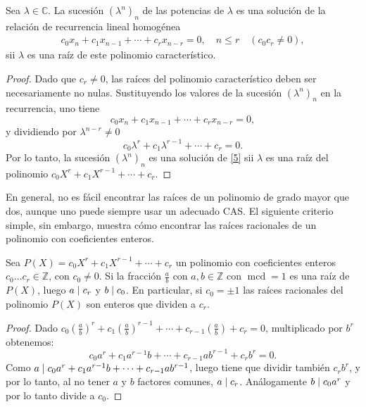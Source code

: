 \begin{proposition}
	Sea $\lambda\in\mathds{C}$. La sucesión $\left(\lambda^{n}\right)_{n}$ de las potencias de $\lambda$ es una solución de la relación de recurrencia lineal homogénea
	\begin{align}\label{5}
	c_{0}x_{n}+c_{1}x_{n-1}+\cdots+c_{r}x_{n-r}=0,\quad n\leq r \quad (c_{0}c_{r}\neq 0),
	\end{align}
	sii $\lambda$ es una raíz de este polinomio característico.
\end{proposition}

\begin{proof}
	Dado que $c_{r}\neq0$, las raíces del polinomio característico deben ser necesariamente no nulas. Sustituyendo los valores de la sucesión ${\left(\lambda^{n}\right)}_{n}$ en la recurrencia, uno tiene \[ c_{0}x_{n}+c_{1}x_{n-1}+\cdots+c_{r}x_{n-r}=0, \] y dividiendo por $\lambda^{n-r}\neq0$ \[ c_{0}\lambda^{r}+c_{1}\lambda^{r-1}+\cdots+c_{r}=0. \]	Por lo tanto, la sucesión ${\left(\lambda^{n}\right)}_{n}$ es una solución de \eqref{5} sii $\lambda$ es una raíz del polinomio $c_{0}X^{r}+c_{1}X^{r-1}+\cdots+c_{r}$.
\end{proof}

En general, no es fácil encontrar las raíces de un polinomio de grado mayor que dos, aunque uno puede siempre usar un adecuado CAS. El siguiente criterio simple, sin embargo, muestra cómo encontrar las raíces racionales de un polinomio con coeficientes enteros.

\begin{proposition}
	Sea $P(X)=c_{0}X^{r}+c_{1}X^{r-1}+\cdots+c_{r}$ un polinomio con coeficientes enteros $c_{0}\ldots c_{r}\in\mathds{Z}$, con $c_{0}\neq 0$. Si la fracción $\tfrac{a}{b}$ con $a,b\in\mathds{Z}$ con $\operatorname{mcd}=1$ es una raíz de $P(X)$, luego $a\mid c_{r}$ y $b\mid c_{0}$. En particular, si $c_{0}=\pm1$ las raíces racionales del polinomio $P(X)$ son enteros que dividen a $c_{r}$.
\end{proposition}

\begin{proof}
	Dado $c_{0}\left(\frac{a}{b}\right)^{r}+c_{1}{\left(\frac{a}{b}\right)}^{r-1}+\cdots+c_{r-1}\left(\frac{a}{b}\right)+c_{r}=0$, multiplicado por $b^{r}$ obtenemos: \[ 	c_{0}a^{r}+c_{1}a^{r-1}b+\cdots+c_{r-1}ab^{r-1}+c_{r}b^{r}=0. \] Como $a\mid c_{0}a^{r}+c_{1}a^{r-1}b+\cdots+c_{r-1}ab^{r-1}$, luego tiene que dividir también $c_{r}b^{r}$, y por lo tanto, al no tener $a$ y $b$ factores comunes, $a\mid c_{r}$. Análogamente $b\mid c_{0}a^{r}$ y por lo tanto divide a $c_{0}$.
\end{proof}

